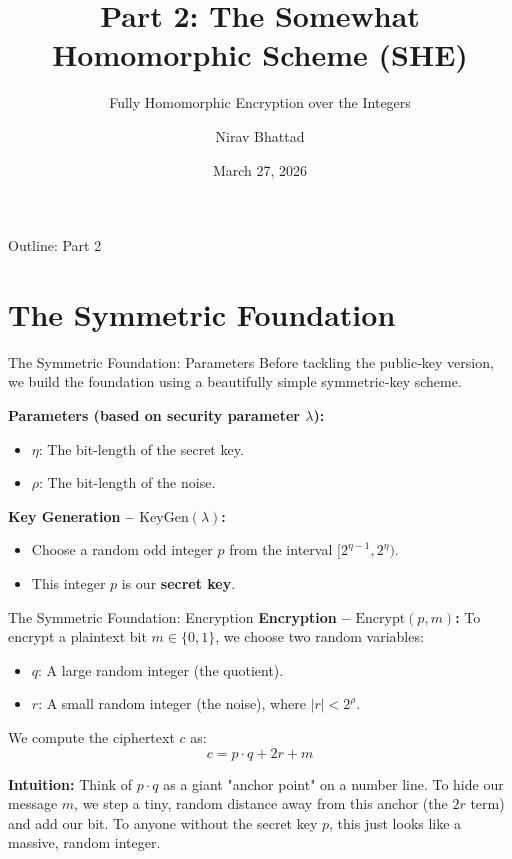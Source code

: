 \documentclass[10pt, aspectratio=169]{beamer}
\title[The SHE Scheme]{Part 2: The Somewhat Homomorphic Scheme (SHE)}
\subtitle{Fully Homomorphic Encryption over the Integers}
\author{Nirav Bhattad}
\date{March 27, 2026}
\begin{document}
\frame{\titlepage}

\begin{frame}{Outline: Part 2}
    \tableofcontents
\end{frame}

\section{The Symmetric Foundation}
\begin{frame}{The Symmetric Foundation: Parameters}
    Before tackling the public-key version, we build the foundation using a beautifully simple symmetric-key scheme. 
    
    \vspace{0.3cm}
    \textbf{Parameters (based on security parameter $\lambda$):}
    \begin{itemize}
        \item $\eta$: The bit-length of the secret key.
        \item $\rho$: The bit-length of the noise.
    \end{itemize}
    \pause
    
    \vspace{0.3cm}
    \textbf{Key Generation -- $\text{KeyGen}(\lambda)$:}
    \begin{itemize}
        \item Choose a random odd integer $p$ from the interval $[2^{\eta-1}, 2^{\eta})$.
        \item This integer $p$ is our \textbf{secret key}.
    \end{itemize}
\end{frame}

\begin{frame}{The Symmetric Foundation: Encryption}
    \textbf{Encryption -- $\text{Encrypt}(p, m)$:}
    To encrypt a plaintext bit $m \in \{0,1\}$, we choose two random variables:
    \begin{itemize}
        \item $q$: A large random integer (the quotient).
        \item $r$: A small random integer (the noise), where $|r| < 2^{\rho}$.
    \end{itemize}
    \pause
    
    \vspace{0.3cm}
    We compute the ciphertext $c$ as:
    $$c = p \cdot q + 2r + m$$
    \pause

    \vspace{0.3cm}
    \textbf{Intuition:} 
    Think of $p \cdot q$ as a giant "anchor point" on a number line. To hide our message $m$, we step a tiny, random distance away from this anchor (the $2r$ term) and add our bit. To anyone without the secret key $p$, this just looks like a massive, random integer.
\end{frame}
\end{document}
